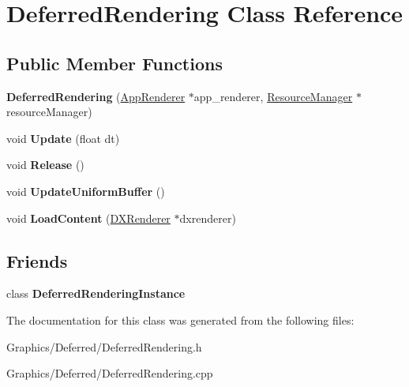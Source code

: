 \hypertarget{classDeferredRendering}{}\section{Deferred\+Rendering Class Reference}
\label{classDeferredRendering}
\subsection*{Public Member Functions}
\begin{DoxyCompactItemize}
\item 
\mbox{\label{classDeferredRendering_ab4a24dc0c49a14bb7a3596c9462d93a0}} 
{\bfseries Deferred\+Rendering} (\hyperlink{classAppRenderer}{App\+Renderer} $\ast$app\+\_\+renderer, \hyperlink{classResourceManager}{Resource\+Manager} $\ast$resource\+Manager)
\item 
\mbox{\label{classDeferredRendering_a5a05961f939d07ef4cb5daba249a6ae4}} 
void {\bfseries Update} (float dt)
\item 
\mbox{\label{classDeferredRendering_af9af71f517c1d1a698d2ea5da4612e0a}} 
void {\bfseries Release} ()
\item 
\mbox{\label{classDeferredRendering_a27bff08989adc1825e418400e4d62ba9}} 
void {\bfseries Update\+Uniform\+Buffer} ()
\item 
\mbox{\label{classDeferredRendering_a34ab245657e86def038a054937ab5420}} 
void {\bfseries Load\+Content} (\hyperlink{classDXRenderer}{D\+X\+Renderer} $\ast$dxrenderer)
\end{DoxyCompactItemize}
\subsection*{Friends}
\begin{DoxyCompactItemize}
\item 
\mbox{\label{classDeferredRendering_a7bec99218ac38952a4baa8888bc7fedc}} 
class {\bfseries Deferred\+Rendering\+Instance}
\end{DoxyCompactItemize}


The documentation for this class was generated from the following files\+:\begin{DoxyCompactItemize}
\item 
Graphics/\+Deferred/Deferred\+Rendering.\+h\item 
Graphics/\+Deferred/Deferred\+Rendering.\+cpp\end{DoxyCompactItemize}
